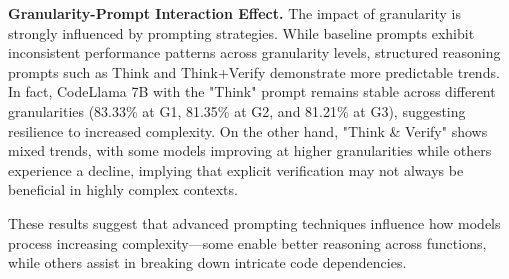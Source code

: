 \documentclass[sigconf]{acmart}
\begin{document}
\textbf{Granularity-Prompt Interaction Effect.} The impact of granularity is strongly influenced by prompting strategies. While baseline prompts exhibit inconsistent performance patterns across granularity levels, structured reasoning prompts such as Think and Think+Verify demonstrate more predictable trends. In fact, CodeLlama 7B with the "Think" prompt remains stable across different granularities (83.33\% at G1, 81.35\% at G2, and 81.21\% at G3), suggesting resilience to increased complexity. On the other hand, "Think \& Verify" shows mixed trends, with some models improving at higher granularities while others experience a decline, implying that explicit verification may not always be beneficial in highly complex contexts.

These results suggest that advanced prompting techniques influence how models process increasing complexity—some enable better reasoning across functions, while others assist in breaking down intricate code dependencies.
\end{document}
